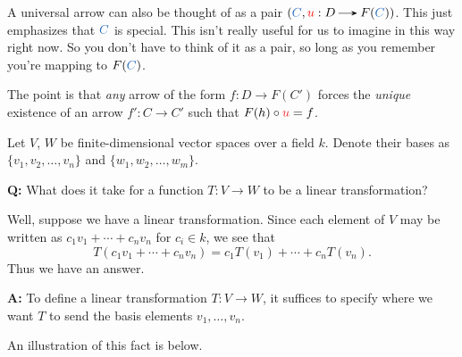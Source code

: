     A universal arrow can also be thought of as a pair $(\textcolor{NavyBlue}{C}, \textcolor{red}{u}: D \to F(\textcolor{NavyBlue}{C}))$.
    This just emphasizes that $\textcolor{NavyBlue}{C}$ is special. 
    This isn't really useful for us to imagine in this way right now. 
    So you don't have to think of it as a pair, so long as you remember you're mapping to
    $F(\textcolor{NavyBlue}{C})$. 

    The point is that \textit{any} arrow of the form $f: D \to F(C')$
    forces the \textit{unique} existence of an arrow $f' : C \to C'$
    such that $F(h) \circ \textcolor{Red}{u} = f$.  

    \begin{example}
        Let $V$, $W$ be finite-dimensional vector spaces over a field $k$. Denote their 
        bases as $\{v_1,  v_2, \dots, v_n\}$ and $\{w_1, w_2, \dots, w_m\}$. 
        \begin{center}
            \begin{minipage}{0.8\textwidth}
                \textbf{Q:} What does it take for a function $T: V \to W$ to be a linear transformation? 
            \end{minipage}
        \end{center}
        Well, suppose we have a linear transformation. Since each element of 
        $V$ may be written as $c_1v_1 + \cdots + c_nv_n$  for $c_i \in k$, we 
        see that 
        \[
            T(c_1v_1 + \cdots + c_nv_n) = c_1T(v_1) + \cdots + c_nT(v_n).
        \]
        Thus we have an answer. 
        \begin{center}
            \begin{minipage}{0.8\textwidth}
                \textbf{A:} To define a linear transformation $T: V \to W$, it suffices to specify 
                where we want $T$ to send the basis elements $v_1, \dots, v_n$.
            \end{minipage}
        \end{center}
        An illustration of this fact is below. 
        \begin{center}
\end{center}
\end{example}
